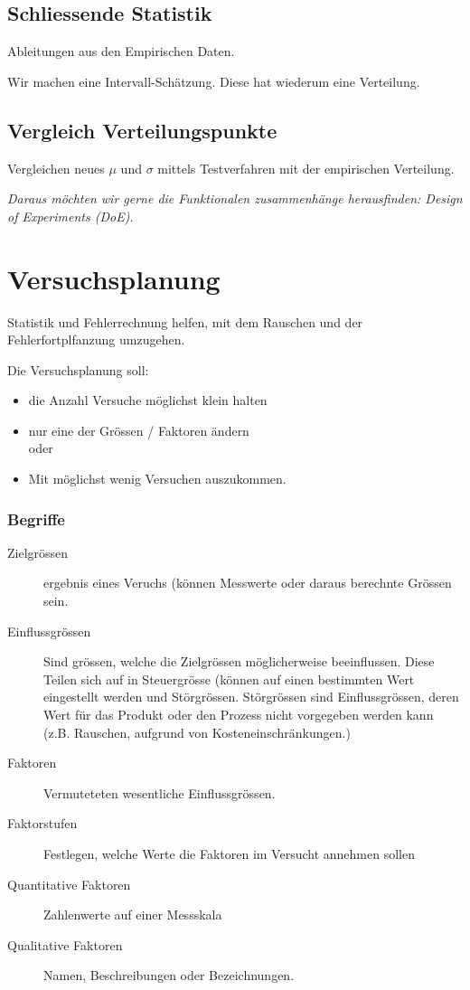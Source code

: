\subsection{Schliessende Statistik}

Ableitungen aus den Empirischen Daten.

Wir machen eine Intervall-Schätzung. Diese hat wiederum eine Verteilung.


\subsection{Vergleich Verteilungspunkte}

Vergleichen neues $\mu$ und $\sigma$ mittels Testverfahren mit der empirischen Verteilung.

\emph{Daraus möchten wir gerne die Funktionalen zusammenhänge herausfinden: Design of Experiments (DoE).}

\section{Versuchsplanung}

Statistik und Fehlerrechnung helfen, mit dem Rauschen und der Fehlerfortplfanzung umzugehen.

Die Versuchsplanung soll:

\begin{itemize}
\item die Anzahl Versuche möglichst klein halten
\item nur eine der Grössen / Faktoren ändern \\
oder
\item Mit möglichst wenig Versuchen auszukommen.
\end{itemize}

\subsubsection{Begriffe}
\begin{description}
\item[Zielgrössen] ergebnis eines Veruchs (können Messwerte oder daraus berechnte Grössen sein.

\item[Einflussgrössen] Sind grössen, welche die Zielgrössen möglicherweise beeinflussen. Diese Teilen sich auf in Steuergrösse (können auf einen bestimmten Wert eingestellt werden und Störgrössen.
Störgrössen sind Einflussgrössen, deren Wert für das Produkt oder den Prozess nicht vorgegeben werden kann (z.B. Rauschen, aufgrund von Kosteneinschränkungen.)
\item[Faktoren] Vermuteteten wesentliche Einflussgrössen.
\item[Faktorstufen] Festlegen, welche Werte die Faktoren im Versucht annehmen sollen
\item[Quantitative Faktoren] Zahlenwerte auf einer Messskala
\item[Qualitative Faktoren] Namen, Beschreibungen oder Bezeichnungen.
\end{description}


